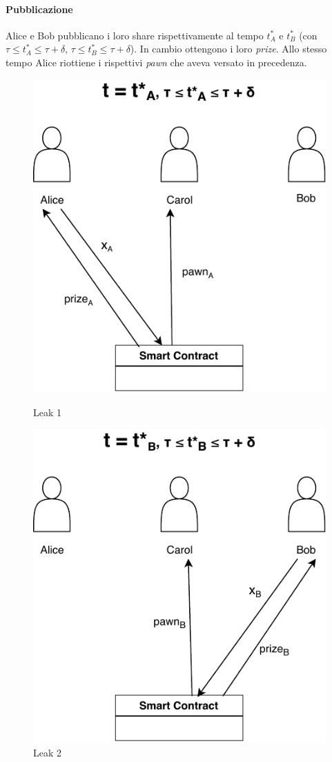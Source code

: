 \paragraph{Pubblicazione}
Alice e Bob pubblicano i loro share rispettivamente al tempo $ t^*_A $ e $ t^*_B $
(con $ \tau \leq t^*_A \leq \tau + \delta $, $ \tau \leq t^*_B \leq \tau + \delta $).
In cambio ottengono i loro
\textit{prize}.
Allo stesso tempo Alice riottiene i rispettivi \textit{pawn} che aveva versato
in precedenza.
\begin{figure}[H]
	\begin{minipage}{0.5\textwidth}
		\centering
		\includegraphics[width=.7\linewidth]{images/chap_protocollo/avanzato-pubblicazione-a.pdf}
		\caption{Leak 1}
	\end{minipage}\hfill
	\begin{minipage}{0.5\textwidth}
		\centering
		\includegraphics[width=.7\linewidth]{images/chap_protocollo/avanzato-pubblicazione-b.pdf}
		\caption{Leak 2}
	\end{minipage}
\end{figure}

